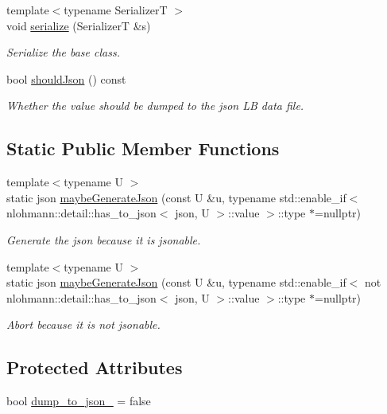 \begin{DoxyCompactItemize}
{\footnotesize template$<$typename SerializerT $>$ }\\void \hyperlink{structvt_1_1vrt_1_1collection_1_1storage_1_1_store_elm_base_a6552c32f1795ca501635036adc4e21d7}{serialize} (SerializerT \&s)
\begin{DoxyCompactList}\small\item\em Serialize the base class. \end{DoxyCompactList}\item 
bool \hyperlink{structvt_1_1vrt_1_1collection_1_1storage_1_1_store_elm_base_add1ac8f8fa0142bebb916bfd0474cc16}{should\+Json} () const
\begin{DoxyCompactList}\small\item\em Whether the value should be dumped to the json LB data file. \end{DoxyCompactList}\end{DoxyCompactItemize}
\subsection*{Static Public Member Functions}
\begin{DoxyCompactItemize}
\item 
{\footnotesize template$<$typename U $>$ }\\static json \hyperlink{structvt_1_1vrt_1_1collection_1_1storage_1_1_store_elm_base_a4eb9b66378b5abbd2ba5ae80a4611e66}{maybe\+Generate\+Json} (const U \&u, typename std\+::enable\+\_\+if$<$ nlohmann\+::detail\+::has\+\_\+to\+\_\+json$<$ json, U $>$\+::value $>$\+::type $\ast$=nullptr)
\begin{DoxyCompactList}\small\item\em Generate the json because it is jsonable. \end{DoxyCompactList}\item 
{\footnotesize template$<$typename U $>$ }\\static json \hyperlink{structvt_1_1vrt_1_1collection_1_1storage_1_1_store_elm_base_a5d1ccb671d2f0616eb257de00988fbac}{maybe\+Generate\+Json} (const U \&u, typename std\+::enable\+\_\+if$<$ not nlohmann\+::detail\+::has\+\_\+to\+\_\+json$<$ json, U $>$\+::value $>$\+::type $\ast$=nullptr)
\begin{DoxyCompactList}\small\item\em Abort because it is not jsonable. \end{DoxyCompactList}\end{DoxyCompactItemize}
\subsection*{Protected Attributes}
\begin{DoxyCompactItemize}
\item 
bool \hyperlink{structvt_1_1vrt_1_1collection_1_1storage_1_1_store_elm_base_a7bd87e77194a384ecb0a7450d9e7a24a}{dump\+\_\+to\+\_\+json\+\_\+} = false
\end{DoxyCompactItemize}


